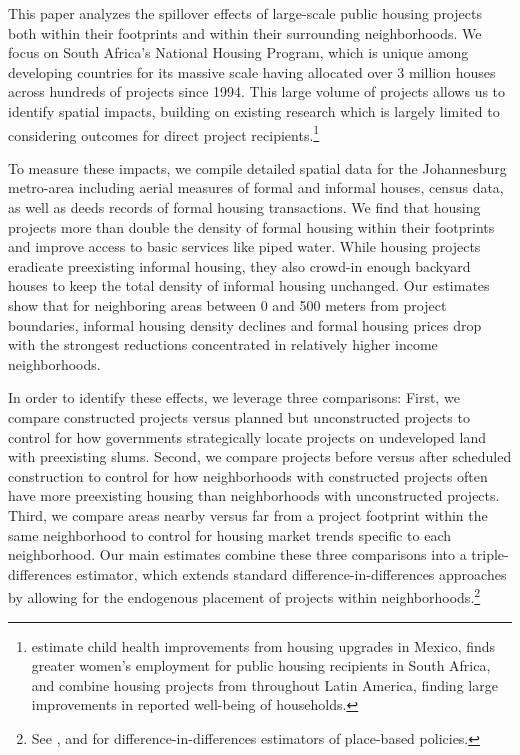 \documentclass[12pt]{article}
\begin{document}
This paper analyzes the spillover effects of large-scale public housing projects both within their footprints and within their surrounding neighborhoods.  We focus on South Africa's National Housing Program, which is unique among developing countries for its massive scale having allocated over 3 million houses across hundreds of projects since 1994.  This large volume of projects allows us to identify spatial impacts, building on existing research which is largely limited to considering outcomes for direct project recipients.\footnote{\cite{cattaneo2009housing} estimate child health improvements from housing upgrades in Mexico, \cite{franklin2016enabled} finds greater women's employment for public housing recipients in South Africa, and \cite{galiani2017shelter} combine housing projects from throughout Latin America, finding large improvements in reported well-being of households.}  

To measure these impacts, we compile detailed spatial data for the Johannesburg metro-area including aerial measures of formal and informal houses, census data, as well as deeds records of formal housing transactions.  We find that housing projects more than double the density of formal housing within their footprints and improve access to basic services like piped water.  While housing projects eradicate preexisting informal housing, they also crowd-in enough backyard houses to keep the total density of informal housing unchanged.  Our estimates show that for neighboring areas between 0 and 500 meters from project boundaries, informal housing density declines and formal housing prices drop with the strongest reductions concentrated in relatively higher income neighborhoods.

In order to identify these effects, we leverage three comparisons:  First, we compare constructed projects versus planned but unconstructed projects to control for how governments strategically locate projects on undeveloped land with preexisting slums.  Second, we compare projects before versus after scheduled construction to control for how neighborhoods with constructed projects often have more preexisting housing than neighborhoods with unconstructed projects.  Third, we compare areas nearby versus far from a project footprint within the same neighborhood to control for housing market trends specific to each neighborhood.  Our main estimates combine these three comparisons into a triple-differences estimator, which extends standard difference-in-differences approaches by allowing for the endogenous placement of projects within neighborhoods.\footnote{See \cite{rossi2010housing,hornbeck2017creative}, and \cite{diamond2016wants} for difference-in-differences estimators of place-based policies.}  
\end{document}
